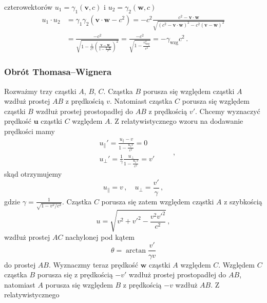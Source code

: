 \documentclass[../main.tex]{subfiles}
\begin{document}
czterowektorów \(u_1=\gamma_1(\mathbf{v},c)\) i \(u_2=\gamma_2(\mathbf{w},c)\)
\begin{equation*}
\begin{split}
    u_1\cdot u_2&=\gamma_1\gamma_2\left(\mathbf{v}\cdot\mathbf{w}-c^2\right)=-c^2\frac{c^2-\mathbf{v}\cdot\mathbf{w}}{\sqrt{(c^2-\mathbf{v}\cdot\mathbf{w})^2-c^2(\mathbf{v}-\mathbf{w})^2}}\\
    &=\frac{-c^2}{\sqrt{1-\frac{1}{c^2}\left(\frac{\mathbf{v}-\mathbf{w}}{1-\frac{\mathbf{v}\cdot\mathbf{w}}{c^2}}\right)^2}}=\frac{-c^2}{\sqrt{1-\frac{v^2_\text{wzg}}{c^2}}}=-\gamma_\text{wzg}c^2\,.
\end{split}
\end{equation*}
\subsubsection{Obrót Thomasa--Wignera}
Rozważmy trzy cząstki \(A\), \(B\), \(C\). Cząstka \(B\) porusza się względem cząstki \(A\) wzdłuż
prostej \(AB\) z prędkością \(v\). Natomiast cząstka \(C\) porusza się względem cząstki \(B\) wzdłuż
prostej prostopadłej do \(AB\) z prędkością \(v'\). Chcemy wyznaczyć prędkość \(\mathbf{u}\) cząstki
\(C\) względem \(A\). Z relatywistycznego wzoru na dodawanie prędkości mamy
\begin{equation*}
\begin{split}
    &u_\parallel'=\frac{u_\parallel-v}{1-\frac{u_\parallel v}{c^2}}=0\\
    &u_\perp '=\frac{1}{\gamma}\frac{u_\perp}{1-\frac{u_\parallel v}{c^2}}=v'
\end{split}\quad\quad\,,
\end{equation*}
skąd otrzymujemy
\begin{equation*}
    u_\parallel=v\,,\quad u_\perp=\frac{v'}{\gamma}\,,
\end{equation*}
gdzie \(\gamma=\frac{1}{\sqrt{1-v^2/c^2}}\). Cząstka \(C\) porusza się zatem względem cząstki \(A\)
z szybkością
\begin{equation*}
    u=\sqrt{v^2+v'^2-\frac{v^2v'^2}{c^2}}\,,
\end{equation*}
wzdłuż prostej \(AC\) nachylonej pod kątem
\begin{equation*}
    \theta=\arctan\frac{v'}{\gamma v}
\end{equation*}
do prostej \(AB\). Wyznaczmy teraz prędkość \(\mathbf{w}\) cząstki \(A\) względem \(C\). Względem
\(C\) cząstka \(B\) porusza się z prędkością \(-v'\) wzdłuż prostej prostopadłej do \(AB\),
natomiast \(A\) porusza się względem \(B\) z prędkością \(-v\) wzdłuż \(AB\). Z relatywistycznego
\end{document}

